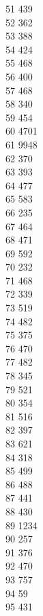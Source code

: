 { 51	439 \\
 52	362 \\
 53	388 \\
 54	424 \\
 55	468 \\
 56	400 \\
 57	468 \\
 58	340 \\
 59	454 \\
 60	4701 \\
 61	9948 \\
 62	370 \\
 63	393 \\
 64	477 \\
 65	583 \\
 66	235 \\
 67	464 \\
 68	471 \\
 69	592 \\
 70	232 \\
 71	468 \\
 72	339 \\
 73	519 \\
 74	482 \\
 75	375 \\
 76	470 \\
 77	482 \\
 78	345 \\
 79	521 \\
 80	354 \\
 81	516 \\
 82	397 \\
 83	621 \\
 84	318 \\
 85	499 \\
 86	488 \\
 87	441 \\
 88	430 \\
 89	1234 \\
 90	257 \\
 91	376 \\
 92	470 \\
 93	757 \\
 94	59 \\
 95	431 \\
}
